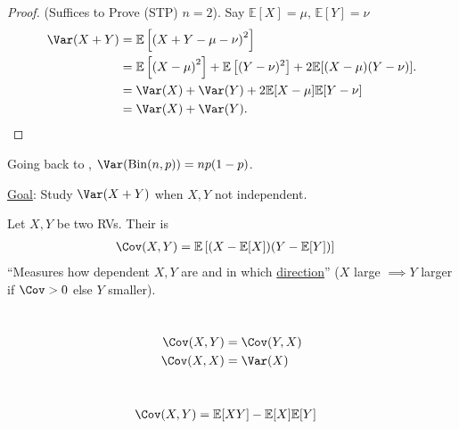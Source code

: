 \begin{proof}
    (Suffices to Prove (STP) $n = 2$). 
    Say $\mathbb{E}[X] = \mu,\, \mathbb{E}[Y] = \nu$
    \begin{align*}
        \Var(X + Y) &= \mathbb{E}\left[ \left( X + Y - \mu - \nu \right)^2 \right] \\
        &= \mathbb{E} \left[ \left( X - \mu \right)^2 \right] + \mathbb{E}\left[ (Y - \nu)^2 \right] + 2 \mathbb{E}[(X - \mu)(Y - \nu)]. \\
        &= \Var(X) + \Var(Y) + 2 \mathbb{E}[X - \mu] \mathbb{E}[Y - \nu] \\
        &= \Var(X) + \Var(Y).
    \end{align*} 
\end{proof} 


\begin{example}[Binomial]
    Going back to , $\Var(\operatorname{Bin}(n, p)) = n p(1-p)$.
\end{example} 

\underline{Goal}: Study $\Var(X + Y)$ when $X, Y$ not independent.

\begin{definition}[Covariance]
    Let $X, Y$ be two RVs.
    Their  is 
    \begin{align*}
        \Cov(X, Y) &= \mathbb{E}\left[ (X - \mathbb{E}[X]) (Y - \mathbb{E}[Y]) \right]
    \end{align*} 
    \color{blue} ``Measures how dependent $X, Y$ are and in which \underline{direction}'' ($X$ large $\implies Y$ larger if $\Cov > 0$ else $Y$ smaller).
\end{definition} 

\begin{proposition}[Properties] ~\vspace*{-1.5\baselineskip}
    \begin{align*}
        \Cov(X, Y) &= \Cov(Y, X) \\
        \Cov(X, X) &= \Var(X)
    \end{align*} 
\end{proposition} 

\begin{definition} ~\vspace*{-1.5\baselineskip}
    \begin{align*}
        \Cov(X, Y) &= \mathbb{E}[XY] - \mathbb{E}[X]\mathbb{E}[Y]
    \end{align*} 
\end{definition} 

